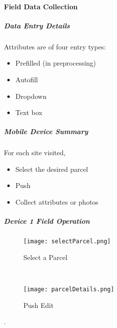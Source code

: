  \paragraph{Field Data Collection}
 \subparagraph{Data Entry Details}

 Attributes are of four entry types:
 \begin{itemize}
 \item Prefilled {\scriptsize (in preprocessing)}
 \item Autofill
 \item Dropdown
 \item Text box
 \end{itemize}
 \vspace{1in}

 \subparagraph{Mobile Device Summary}

 For each site visited,

 \begin{itemize}
 \item Select the desired parcel
 \item Push 
 \item Collect attributes or photos
 \end{itemize}

 \clearpage


\subparagraph{Device 1 Field Operation}

\begin{wrapfigure}{r}{0.5\textwidth}
\centering
    \texttt{[image: selectParcel.png]}
\caption {Select a Parcel}
\vspace{.25in}

\HRule \\[.4cm] %
\vspace{.25in}

\centering
    \texttt{[image: parcelDetails.png]}
\caption{Push Edit}
\end{wrapfigure}
.
\vspace{2.5in}

\vspace{4.5in}

